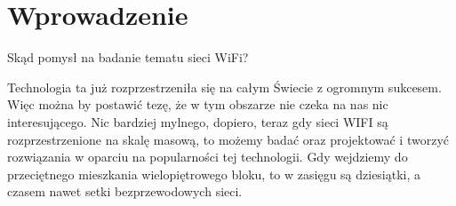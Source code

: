 \chapter*{Wprowadzenie}
\label{ch:wprowadz}

Skąd pomysł na badanie tematu sieci WiFi?

Technologia ta już rozprzestrzeniła się na całym Świecie z ogromnym sukcesem. Więc można by postawić tezę, że w tym obszarze nie czeka na nas nic interesującego. Nic bardziej mylnego, dopiero, teraz gdy sieci WIFI są rozprzestrzenione na skalę masową, to możemy badać oraz projektować i tworzyć rozwiązania w oparciu na popularności tej technologii. Gdy wejdziemy do przeciętnego mieszkania wielopiętrowego bloku, to w zasięgu są dziesiątki, a czasem nawet setki bezprzewodowych sieci.
